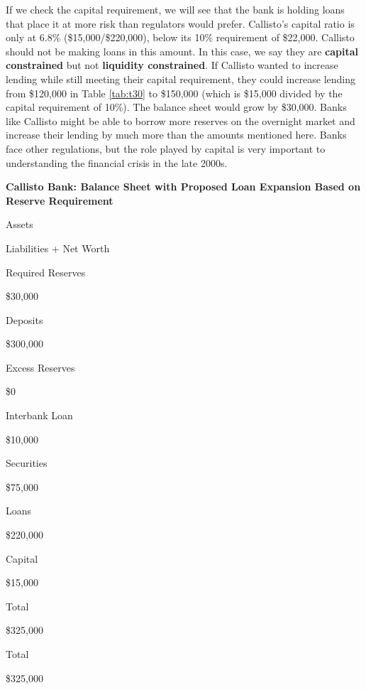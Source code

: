 \documentclass[
]{book}
\begin{document}
If we check the capital requirement, we will see that the bank is holding loans that place it at more risk than regulators would prefer. Callisto's capital ratio is only at 6.8\% (\$15,000/\$220,000), below its 10\% requirement of \$22,000. Callisto should not be making loans in this amount. In this case, we say they are \textbf{capital constrained} but not \textbf{liquidity constrained}. If Callisto wanted to increase lending while still meeting their capital requirement, they could increase lending from \$120,000 in Table \ref{tab:t30} to \$150,000 (which is \$15,000 divided by the capital requirement of 10\%). The balance sheet would grow by \$30,000. Banks like Callisto might be able to borrow more reserves on the overnight market and increase their lending by much more than the amounts mentioned here. Banks face other regulations, but the role played by capital is very important to understanding the financial crisis in the late 2000s.

\label{tab:t29}\textbf{Callisto Bank: Balance Sheet with Proposed Loan Expansion Based on Reserve Requirement}

Assets

Liabilities + Net Worth

Required Reserves

\$30,000

Deposits

\$300,000

Excess Reserves

\$0

Interbank Loan

\$10,000

Securities

\$75,000

Loans

\$220,000

Capital

\$15,000

Total

\$325,000

Total

\$325,000
\end{document}
